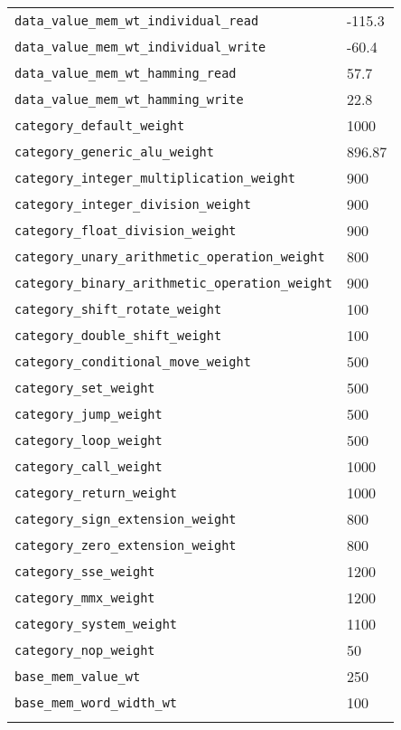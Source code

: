 \begin{longtable}{l|l}
  \texttt{data\_value\_mem\_wt\_individual\_read} & -115.3 \\
  \texttt{data\_value\_mem\_wt\_individual\_write} & -60.4 \\

  \texttt{data\_value\_mem\_wt\_hamming\_read} & 57.7 \\
  \texttt{data\_value\_mem\_wt\_hamming\_write} & 22.8 \\

  \texttt{category\_default\_weight} & 1000 \\
  \texttt{category\_generic\_alu\_weight} & 896.87 \\
  \texttt{category\_integer\_multiplication\_weight} & 900 \\
  \texttt{category\_integer\_division\_weight} & 900 \\
  \texttt{category\_float\_division\_weight} & 900 \\
  \texttt{category\_unary\_arithmetic\_operation\_weight} & 800 \\
  \texttt{category\_binary\_arithmetic\_operation\_weight} & 900 \\
  \texttt{category\_shift\_rotate\_weight} & 100 \\
  \texttt{category\_double\_shift\_weight} & 100 \\
  \texttt{category\_conditional\_move\_weight} & 500 \\
  \texttt{category\_set\_weight} & 500 \\
  \texttt{category\_jump\_weight} & 500 \\
  \texttt{category\_loop\_weight} & 500 \\
  \texttt{category\_call\_weight} & 1000 \\
  \texttt{category\_return\_weight} & 1000 \\
  \texttt{category\_sign\_extension\_weight} & 800 \\
  \texttt{category\_zero\_extension\_weight} & 800 \\
  \texttt{category\_sse\_weight} & 1200 \\
  \texttt{category\_mmx\_weight} & 1200 \\
  \texttt{category\_system\_weight} & 1100 \\
  \texttt{category\_nop\_weight} & 50 \\

  \texttt{base\_mem\_value\_wt} & 250 \\
  \texttt{base\_mem\_word\_width\_wt} & 100 \\

  \hline \\
\end{longtable}
